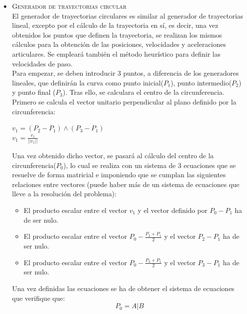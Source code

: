 \begin{itemize}
	\item \textsc{Generador de trayectorias circular}\\
	
	El generador de trayectorias circulares es similar al generador de trayectorias lineal, excepto por el cálculo de la trayectoria en sí, es decir, una vez obtenidos los puntos que definen la trayectoria, se realizan los mismos cálculos para la obtención de las posiciones, velocidades y aceleraciones articulares. Se empleará también el método heurístico para definir las velocidades de paso.\\

	Para empezar, se deben introducir 3 puntos, a diferencia de los generadores lineales, que definirán la curva como punto inicial($P_1$), punto intermedio($P_2$) y punto final ($P_3$). Tras ello, se calculara el centro de la circunferencia.\\

	Primero se calcula el vector unitario perpendicular al plano definido por la circunferencia:
	\begin{center}
	$v_1=(P_2-P_1)\wedge(P_3-P_1)$\\
	$v_1=\frac{v_1}{||v_1||}$\\
	\end{center}

	Una vez obtenido dicho vector, se pasará al cálculo del centro de la circunferencia($P_0$), lo cual se realiza con un sistema de 3 ecuaciones que se resuelve de forma matricial e imponiendo que se cumplan las siguientes relaciones entre vectores (puede haber más de un sistema de ecuaciones que lleve a la resolución del problema):

	\begin{itemize}
		\item El producto escalar entre el vector $v_1$ y el vector definido por $P_0-P_1$ ha de ser nulo.\\
		\item El producto escalar entre el vector $P_0-\frac{P_2+P_1}{2}$ y el vector $P_2-P_1$ ha de ser nulo.\\
		\item El producto escalar entre el vector $P_0-\frac{P_3+P_1}{2}$ y el vector $P_3-P_1$ ha de ser nulo.\\
	\end{itemize}

	Una vez definidas las ecuaciones se ha de obtener el sistema de ecuaciones que verifique que:\\
	\begin{equation}
		P_0=A|B
	\end{equation}


\end{itemize}

